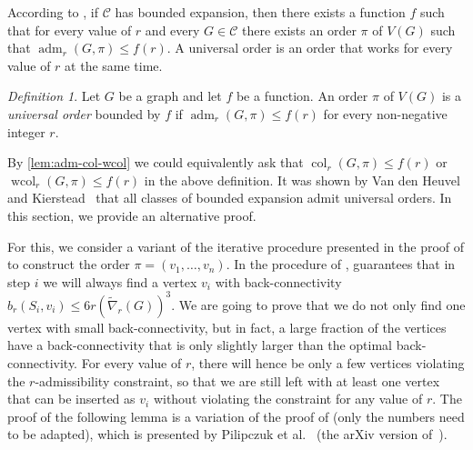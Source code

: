 \documentclass[1p,number,a4paper]{elsarticle}
\theoremstyle{remark}
\newcommand{\Cc}{\mathscr{C}}
\DeclareMathOperator{\col}{col}
\DeclareMathOperator{\wcol}{wcol}
\DeclareMathOperator{\adm}{adm}
\newtheorem{definition}[theorem]{Definition}
\begin{document}
According to , if $\Cc$ has bounded
expansion, then there exists a function $f$ such that 
for every value of $r$ and every $G\in \Cc$ there exists 
an order $\pi$ of $V(G)$ such that $\adm_r(G,\pi)\leq f(r)$.
A universal order is an order that works for every value
of $r$ at the same time. 

\begin{definition}
 Let $G$ be a graph and let $f$ be a function. An order 
 $\pi$ of $V(G)$ is a \emph{universal order} bounded by
 $f$ if $\adm_r(G,\pi)\leq f(r)$ for every non-negative integer $r$. 
\end{definition}

By \cref{lem:adm-col-wcol} we could equivalently ask that
$\col_r(G,\pi)\leq f(r)$ or $\wcol_r(G,\pi)\leq f(r)$ in the
above definition. It was shown by Van den Heuvel and 
Kierstead~\cite{vdH18} that all classes of bounded expansion admit
universal orders. In this section, we provide an alternative proof. 

For this, we consider a variant of 
the iterative procedure presented in the proof of 
to construct the order $\pi=(v_1,\ldots, v_n)$. In the 
procedure of ,  guarantees
that in step $i$ we will always find a vertex $v_i$
with back-connectivity $b_r(S_i,v_i)\leq 
6r(\widetilde\nabla_r(G))^3$.  
We are going to prove that we do not only find one vertex with 
small back-connectivity, but in fact, a large fraction of the
vertices have a
back-connectivity that is only slightly larger than the optimal
back-connectivity. For every value of $r$, there will hence be
only a few vertices violating the $r$-admissibility constraint, 
so that we are still left with at least one vertex that can 
be inserted as $v_i$ without violating the constraint for 
any value of $r$. The proof of the following lemma is 
a variation of the proof of  (only the numbers need to be adapted), which is presented
by Pilipczuk et al.~\cite{pilipczuk2018parameterizedarxiv} (the arXiv version of~\cite{PilipczukST18}). 

\smallskip
\end{document}

